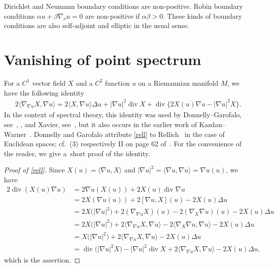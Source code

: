 \documentclass[pdftex]{sigma}
\numberwithin{equation}{section}
\DeclareMathOperator{\diver}{div}
\begin{document}
\begin{exas}
Dirichlet and Neumann boundary conditions are non-positive.
Robin boundary conditions $\alpha u+\beta\nabla_\nu u=0$ are non-positive if $\alpha\beta>0$.
These kinds of boundary conditions are also self-adjoint and elliptic in the usual sense.
\end{exas}

\section{Vanishing of point spectrum}\label{secrell}

For a $C^1$ vector field $X$ and a $C^2$ function $u$ on a Riemannian manifold $M$, we have the following identity
\begin{align}
 2\langle\nabla_{\nabla u}X,\nabla u\rangle
 = 2\langle X,\nabla u\rangle\Delta u + |\nabla u|^2\diver X + \diver\big\{2X(u)\nabla u-|\nabla u|^2X\big\}. \label{rell}
\end{align}
In the context of spectral theory, this identity was used by Donnelly--Garofalo,
see~\cite[Lemma~2.1]{DoGa92}, \cite[Proposition 3.1]{DoGa97}, and Xavier, see~\cite[identity~(1)]{Xavier1988},
but it also occurs in the earlier work of Kazdan--Warner~\cite[identity~(8.1)]{KazdanWarner74c}.
Donnelly and Garofalo attribute \eqref{rell} to Rellich~\cite{Rellich43} in the case of Euclidean spaces;
cf.~(3) respectively II on page 62 of~\cite{Rellich43}.
For the convenience of the reader, we give a~short proof of the identity.

\begin{proof}[Proof of \eqref{rell}]
Since $X(u)=\langle\nabla u, X\rangle$ and $|\nabla u|^2=\langle\nabla u,\nabla u\rangle=\nabla u(u)$, we have
\begin{align*}
 2\diver(X(u)\nabla u)
 &= 2\nabla u(X(u)) + 2X(u)\diver\nabla u \\
 &= 2X(\nabla u(u)) + 2[\nabla u,X](u) - 2X(u)\Delta u \\
 &= 2X\bigl(|\nabla u|^2\bigr) + 2(\nabla_{\nabla u}X)(u) - 2(\nabla_X\nabla u)(u) - 2X(u)\Delta u \\
 &= 2X\bigl(|\nabla u|^2\bigr) + 2\langle\nabla_{\nabla u}X,\nabla u\rangle - 2\langle\nabla_X\nabla u,\nabla u\rangle - 2X(u)\Delta u \\
 &= X\bigl(|\nabla u|^2\bigr) + 2\langle\nabla_{\nabla u}X,\nabla u\rangle - 2X(u)\Delta u \\
 &= \diver\bigl(|\nabla u|^2X\bigr) - |\nabla u|^2\diver X + 2\langle\nabla_{\nabla u}X,\nabla u\rangle - 2X(u)\Delta u,
\end{align*}
which is the assertion.
\end{proof}
\end{document}

